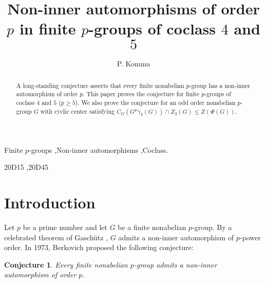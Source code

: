 \documentclass[preprint,sort&compress,12pt]{elsarticle}
\newtheorem*{con}{Conjecture}
\theoremstyle{definition}
\numberwithin{equation}{theorem}
\begin{document}
\begin{frontmatter}

\title{Non-inner automorphisms of order $p$ in finite $p$-groups of coclass $4$ and $5$}



\author[IISER TVM]{P. Komma}
\address[IISER TVM]{School of Mathematics, Indian Institute of Science Education and Research Thiruvananthapuram,\\695551
Kerala, India.}

\begin{abstract}
A long-standing conjecture asserts that every finite nonabelian $p$-group has a non-inner automorphism of order $p$. This paper proves the conjecture for finite $p$-groups of coclass $4$ and $5$ ($p\ge 5$). We also prove the conjecture for an odd order nonabelian $p$-group $G$ with cyclic center satisfying $C_G(G^p\gamma_3(G))\cap Z_3(G)\le Z(\Phi(G))$.
\end{abstract}



\begin{keyword}
Finite $p$-groups \sep Non-inner automorphisms \sep Coclass. 

 \MSC[2010]  20D15 \sep 20D45 

\end{keyword}

\end{frontmatter}



\section{Introduction}
Let $p$ be a prime number and let $G$ be a finite nonabelian $p$-group. By a celebrated theorem of Gasch\"{u}tz \cite{GW}, $G$ admits a non-inner automorphism of $p$-power order. In 1973, Berkovich \cite[Problem 4.3]{MK} proposed the following conjecture:

\begin{con}
Every finite nonabelian $p$-group admits a non-inner automorphism of order $p$.
\end{con}
\end{document}
